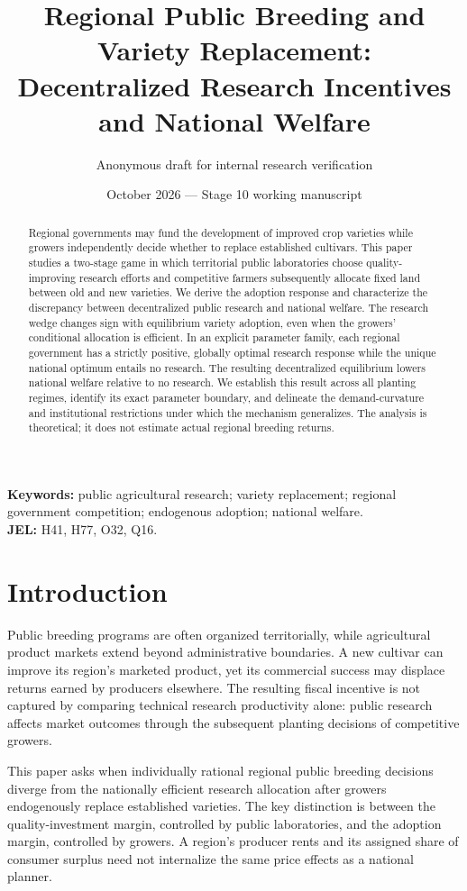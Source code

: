 \documentclass[11pt]{article}
\title{Regional Public Breeding and Variety Replacement: Decentralized Research Incentives and National Welfare}
\author{Anonymous draft for internal research verification}
\date{October 2026 --- Stage 10 working manuscript}
\begin{document}
\maketitle
\begin{abstract}
Regional governments may fund the development of improved crop varieties while growers independently decide whether to replace established cultivars. This paper studies a two-stage game in which territorial public laboratories choose quality-improving research efforts and competitive farmers subsequently allocate fixed land between old and new varieties. We derive the adoption response and characterize the discrepancy between decentralized public research and national welfare. The research wedge changes sign with equilibrium variety adoption, even when the growers' conditional allocation is efficient. In an explicit parameter family, each regional government has a strictly positive, globally optimal research response while the unique national optimum entails no research. The resulting decentralized equilibrium lowers national welfare relative to no research. We establish this result across all planting regimes, identify its exact parameter boundary, and delineate the demand-curvature and institutional restrictions under which the mechanism generalizes. The analysis is theoretical; it does not estimate actual regional breeding returns.
\end{abstract}

\noindent\textbf{Keywords:} public agricultural research; variety replacement; regional government competition; endogenous adoption; national welfare.\\
\textbf{JEL:} H41, H77, O32, Q16.

\section{Introduction}
Public breeding programs are often organized territorially, while agricultural product markets extend beyond administrative boundaries. A new cultivar can improve its region's marketed product, yet its commercial success may displace returns earned by producers elsewhere. The resulting fiscal incentive is not captured by comparing technical research productivity alone: public research affects market outcomes through the subsequent planting decisions of competitive growers.

This paper asks when individually rational regional public breeding decisions diverge from the nationally efficient research allocation after growers endogenously replace established varieties. The key distinction is between the quality-investment margin, controlled by public laboratories, and the adoption margin, controlled by growers. A region's producer rents and its assigned share of consumer surplus need not internalize the same price effects as a national planner.
\end{document}
